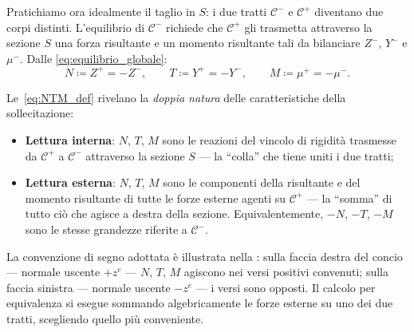 Pratichiamo ora idealmente il taglio in $S$:
i due tratti $\mathcal{C}^-$ e $\mathcal{C}^+$
diventano due corpi distinti. L'equilibrio di
$\mathcal{C}^-$ richiede che $\mathcal{C}^+$
gli trasmetta attraverso la sezione $S$ una forza
risultante e un momento risultante tali da
bilanciare $Z^-$, $Y^-$ e $\mu^-$. Dalle
\eqref{eq:equilibrio_globale}:
\begin{equation}\label{eq:NTM_def}
	\boxed{N \coloneqq Z^+ = -Z^-, \qquad
		T \coloneqq Y^+ = -Y^-, \qquad
		M \coloneqq \mu^+ = -\mu^-.}
\end{equation}

Le~\eqref{eq:NTM_def} rivelano la \emph{doppia
	natura} delle caratteristiche della sollecitazione:
\begin{itemize}[nosep]
	\item \textbf{Lettura interna}: $N$, $T$, $M$
	sono le reazioni del vincolo di rigidità
	trasmesse da $\mathcal{C}^+$ a $\mathcal{C}^-$
	attraverso la sezione $S$ --- la ``colla'' che
	tiene uniti i due tratti;
	\item \textbf{Lettura esterna}: $N$, $T$, $M$
	sono le componenti della risultante e del
	momento risultante di tutte le forze esterne
	agenti su $\mathcal{C}^+$ --- la ``somma'' di
	tutto ciò che agisce a destra della sezione.
	Equivalentemente, $-N$, $-T$, $-M$ sono
	le stesse grandezze riferite a $\mathcal{C}^-$.
\end{itemize}

La convenzione di segno adottata è illustrata
nella : sulla faccia
destra del concio --- normale uscente $+z^e$ ---
$N$, $T$, $M$ agiscono nei versi positivi convenuti;
sulla faccia sinistra --- normale uscente $-z^e$
--- i versi sono opposti. Il calcolo per
equivalenza si esegue sommando algebricamente
le forze esterne su uno dei due tratti, scegliendo
quello più conveniente.

